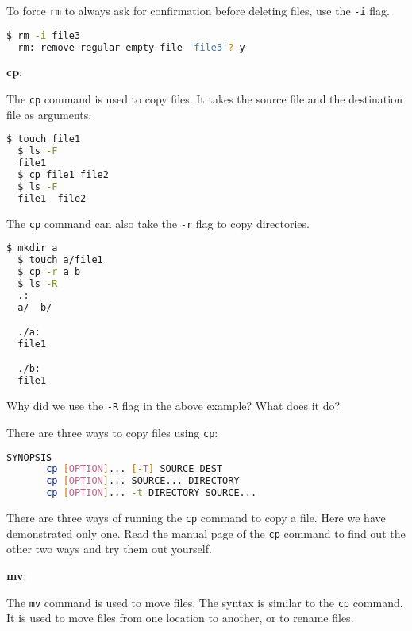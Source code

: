 To force \lstinline|rm| to always ask for confirmation before deleting files, use the \lstinline|-i| flag.

\begin{lstlisting}[language=bash]
  $ rm -i file3
  rm: remove regular empty file 'file3'? y
\end{lstlisting}

\textbf{cp}:

The \lstinline|cp| command is used to copy files.
It takes the source file and the destination file as arguments.

\begin{lstlisting}[language=bash]
  $ touch file1
  $ ls -F
  file1
  $ cp file1 file2
  $ ls -F
  file1  file2
\end{lstlisting}

The \lstinline|cp| command can also take the \lstinline|-r| flag to copy directories.

\begin{lstlisting}[language=bash]
  $ mkdir a
  $ touch a/file1
  $ cp -r a b
  $ ls -R
  .:
  a/  b/

  ./a:
  file1

  ./b:
  file1
\end{lstlisting}

\begin{exercise}
  Why did we use the \lstinline|-R| flag in the above example? What does it do?
\end{exercise}

There are three ways to copy files using \lstinline|cp|:

\begin{lstlisting}[language=bash]
SYNOPSIS
       cp [OPTION]... [-T] SOURCE DEST
       cp [OPTION]... SOURCE... DIRECTORY
       cp [OPTION]... -t DIRECTORY SOURCE...
\end{lstlisting}

\begin{exercise}
  There are three ways of running the \lstinline|cp| command to copy a file.
  Here we have demonstrated only one.
  Read the manual page of the \lstinline|cp| command to find out the other two ways and try them out yourself.
\end{exercise}

\textbf{mv}:

The \lstinline|mv| command is used to move files.
The syntax is similar to the \lstinline|cp| command.
It is used to move files from one location to another, or to rename files.

